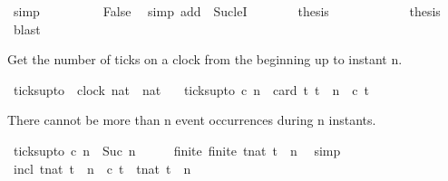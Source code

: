 \begin{isabellebody}
\ simp\isanewline
\ \ \ \ \ \ \isamarkupfalse%
\ \isamarkupfalse%
\ False\ \isamarkupfalse%
\ {\isacharparenleft}simp\ add{\isacharcolon}\ {\isachardoublequoteopen}{\isacharasterisk}{\isachardoublequoteclose}\ Suc{\isacharunderscore}leI{\isacharparenright}\isanewline
\ \ \ \ \isacommand{{\isacharbraceright}}\isamarkupfalse%
\ \isamarkupfalse%
\ {\isacharquery}thesis\ \isacommand{{\isachardot}{\isachardot}}\isamarkupfalse%
\isanewline
\ \ \isamarkupfalse%
\isanewline
\ \ \isamarkupfalse%
\ {}\ \ {}\ \isamarkupfalse%
\ {\isacharquery}thesis\ \isamarkupfalse%
\ blast\isanewline
{}\isamarkupfalse%
%
\endisatagproof
{\isafoldproof}%
%
\isadelimproof
%
\endisadelimproof
%
\begin{isamarkuptext}%
Get the number of ticks on a clock from the beginning up to instant n.%
\end{isamarkuptext}\isamarkuptrue%
\isamarkupfalse%
\ ticks{\isacharunderscore}up{\isacharunderscore}to\ {\isacharcolon}{\isacharcolon}\ {\isacartoucheopen}{\isacharbrackleft}clock{\isacharcomma}\ nat{\isacharbrackright}\ {\isasymRightarrow}\ nat{\isacartoucheclose}\isanewline
\ \ \ {\isacartoucheopen}ticks{\isacharunderscore}up{\isacharunderscore}to\ c\ n\ {\isacharequal}\ card\ {\isacharbraceleft}t{\isachardot}\ t\ {\isasymle}\ n\ {\isasymand}\ c\ t{\isacharbraceright}{\isacartoucheclose}%
\begin{isamarkuptext}%
There cannot be more than n event occurrences during n instants.%
\end{isamarkuptext}\isamarkuptrue%
\isamarkupfalse%
\ {\isacartoucheopen}ticks{\isacharunderscore}up{\isacharunderscore}to\ c\ n\ {\isasymle}\ Suc\ n{\isacartoucheclose}\isanewline
%
\isadelimproof
%
\endisadelimproof
%
\isatagproof
{}\isamarkupfalse%
\ {\isacharminus}\isanewline
\ \ \isamarkupfalse%
\ finite{\isacharcolon}\ {\isacartoucheopen}finite\ {\isacharbraceleft}t{\isacharcolon}{\isacharcolon}nat{\isachardot}\ t\ {\isasymle}\ n{\isacharbraceright}{\isacartoucheclose}\ \isamarkupfalse%
\ simp\isanewline
\ \ \isamarkupfalse%
\ incl{\isacharcolon}\ {\isacartoucheopen}{\isacharbraceleft}t{\isacharcolon}{\isacharcolon}nat{\isachardot}\ t\ {\isasymle}\ n\ {\isasymand}\ c\ t{\isacharbraceright}\ {\isasymsubseteq}\ {\isacharbraceleft}t{\isacharcolon}{\isacharcolon}nat{\isachardot}\ t\ {\isasymle}\ n{\isacharbraceright}{\isacartoucheclose}\ \isamarkupfalse%

\end{isabellebody}
